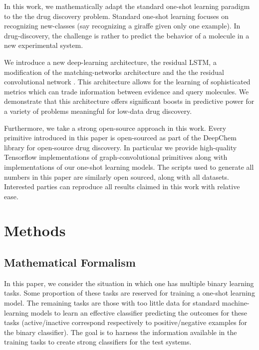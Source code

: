 \documentclass[journal=jacsat,manuscript=article]{achemso}
\begin{document}
In this work, we mathematically adapt the standard one-shot learning paradigm to the the drug discovery problem. Standard one-shot learning focuses on recognizing new-classes (say recognizing a giraffe given only one example). In drug-discovery, the challenge is rather to predict the behavior of a molecule in a new experimental system.

We introduce a new deep-learning architecture, the residual LSTM, a modification of the matching-networks architecture and the the residual convolutional network \cite{he2016identity}. This architecture allows for the learning of sophisticated metrics which can trade information between evidence and query molecules. We demonstrate that this architecture offers significant boosts in predictive power for a variety of problems meaningful for low-data drug discovery.

Furthermore, we take a strong open-source approach in this work. Every primitive introduced in this paper is open-sourced as part of the DeepChem \cite{ram2016} library for open-source drug discovery. In particular we provide high-quality Tensorflow \cite{abadi2016tensorflow} implementations of graph-convolutional primitives along with implementations of our one-shot learning models. The scripts used to generate all numbers in this paper are similarly open sourced, along with all datasets. Interested parties can reproduce all results claimed in this work with relative ease.


\section{Methods}

\subsection{Mathematical Formalism}

In this paper, we consider the situation in which one has multiple binary learning tasks. Some proportion of these tasks are reserved for training a one-shot learning model. The remaining tasks are those with too little data for standard machine-learning models to learn an effective classifier predicting the outcomes for these tasks (active/inactive correspond respectively to positive/negative examples for the binary classifier). The goal is to harness the information available in the training tasks to create strong classifiers for the test systems. 
\end{document}
